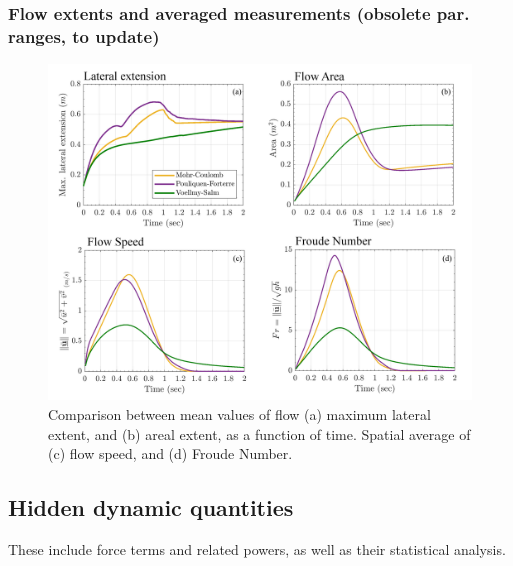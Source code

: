 \documentclass{article}
\begin{document}
\subsubsection{Flow extents and averaged measurements (obsolete par. ranges, to update)}
\begin{figure}[H]
        \centering
        \includegraphics[width=1\textwidth]{Figures/Averaged_combine.png}
        \caption{Comparison between mean values of flow (a) maximum lateral extent, and (b) areal extent, as a function of time. Spatial average of (c) flow speed, and (d) Froude Number.}
        \label{fig:Ramp-spatial}
\end{figure}

\subsection{Hidden dynamic quantities}\label{Hq1}
These include force terms and related powers, as well as their statistical analysis.
\end{document}
